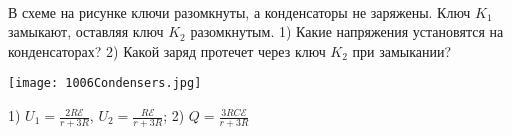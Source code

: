 \begin{ex} 
\hspace{0pt} \\
\begin{minipage}{.65\textwidth}
В схеме на рисунке ключи разомкнуты, а конденсаторы не заряжены. Ключ $K_1$ замыкают, оставляя ключ $K_2$ разомкнутым. 
1) Какие напряжения установятся на конденсаторах? 2) Какой заряд протечет через ключ $K_2$ при замыкании?
\end{minipage}
\begin{minipage}{.35\textwidth}
\centering
\texttt{[image: 1006Condensers.jpg]}
\end{minipage}
\begin{ans}
1) $U_1 = \frac{2R \mathcal{E}}{r+3R}$, $U_2 = \frac{R \mathcal{E}}{r+3R}$; 2) $Q=\frac{3RC\mathcal{E}}{r+3R}$
\end{ans}
\end{ex}

